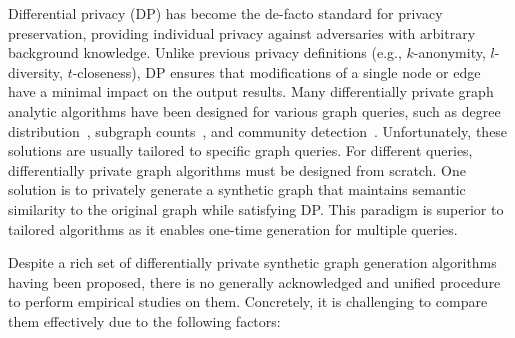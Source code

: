 \documentclass[conference]{IEEEtran}
\theoremstyle{plain}
\begin{document}
Differential privacy (DP) \cite{dwork2014algorithmic,li2016differential} has become the de-facto standard for privacy preservation, providing individual privacy against adversaries with arbitrary background knowledge.
Unlike previous privacy definitions (e.g., $k$-anonymity, $l$-diversity, $t$-closeness), DP ensures that modifications of a single node or edge have a minimal impact on the output results.
Many differentially private graph analytic algorithms have been designed for various graph queries, such as degree distribution~\cite{liu2022crypto,day2016publishing,hay2009accurate}, subgraph counts~\cite{imola2021locally,liu2024cargo,liu2022collecting}, and community detection~\cite{nguyen2016detecting,mohamed2022differentially,fu2024community}.
Unfortunately, these solutions are usually tailored to specific graph queries.
For different queries, differentially private graph algorithms must be designed from scratch.
One solution is to privately generate a synthetic graph that maintains semantic similarity to the original graph while satisfying DP.
This paradigm is superior to tailored algorithms as it enables one-time generation for multiple queries.

Despite a rich set of differentially private synthetic graph generation algorithms \cite{wang2013preserving,nguyen2015differentially,chen2014correlated,mir2012differentially,xiao2014differentially,yuan2023privgraph,chen2019publishing,jorgensen2016publishing,zhang2020community,jian2021publishing,qin2017generating,ju2019generating,ye2020lf,wei2020asgldp,hou2023block,liu2020local} having been proposed, there is no generally acknowledged and unified procedure to perform empirical studies on them.
Concretely, it is challenging to compare them effectively due to the following factors:
\end{document}
